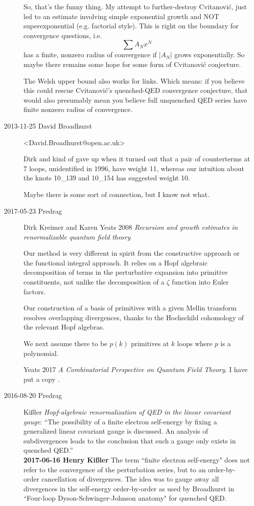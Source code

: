 \begin{description}
So, that's the funny thing.
My attempt to further-destroy Cvitanovi\'c, just led to an estimate
involving simple
exponential growth and NOT superexponential (e.g. factorial style).
This is right on the boundary for convergence questions, i.e.
\[
\sum A_N  x^N
\]
has a finite, nonzero radius of convergence if $|A_N|$ grows
exponentially. So maybe there remains some hope for some form of
Cvitanovi\'c conjecture.

The Welsh upper bound also works for links. Which means: if you believe
this could rescue Cvitanovi\'c's quenched-QED convergence conjecture,
that would also presumably mean you believe full unquenched QED series
have finite nonzero radius of convergence.

\item[2013-11-25  David Broadhurst] <David.Broadhurst@open.ac.uk>

Dirk and kind of gave up when it turned out that a pair
of counterterms at 7 loops, unidentified in 1996,
have weight 11, whereas our intuition about the
knots 10\_139 and 10\_154 has suggested weight 10.

Maybe there is some sort of connection, but I know not what.

\item[2017-05-23 Predrag]
Dirk Kreimer and
{Karen Yeats} 2008
{\em Recursion and growth estimates in renormalizable quantum field theory}

Our method is very different in spirit from the constructive approach or the functional
integral approach. It relies on a Hopf algebraic decomposition of terms in the perturbative
expansion into primitive constituents, not unlike the decomposition of a $\zeta$ function
into Euler factors.

Our construction of a basis of primitives with a given Mellin
transform resolves overlapping divergences, thanks to the Hochschild cohomology of
the relevant Hopf algebras.

We next assume there to be $p(k)$ primitives at $k$ loops where $p$ is a
polynomial.

Yeats 2017 {\em {A Combinatorial Perspective on Quantum Field Theory}}.
I have put a copy .

\item[2016-08-20 Predrag]
Ki{\ss}ler
{\em Hopf-algebraic renormalization of QED in the linear covariant gauge}:
``The possibility of a finite electron self-energy by fixing a
generalized linear covariant gauge is discussed. An analysis of
subdivergences leads to the conclusion that such a gauge only exists in
quenched QED.''
\\{\bf 2017-06-16 Henry Ki{\ss}ler}
The term ``finite electron self-energy" does not refer to the convergence
of the perturbation series, but to an order-by-order cancellation of
divergences. The idea was to gauge away all divergences in the
self-energy order-by-order as used by Broadhurst in
``Four-loop Dyson-Schwinger-Johnson anatomy" for quenched QED.


\end{description}
